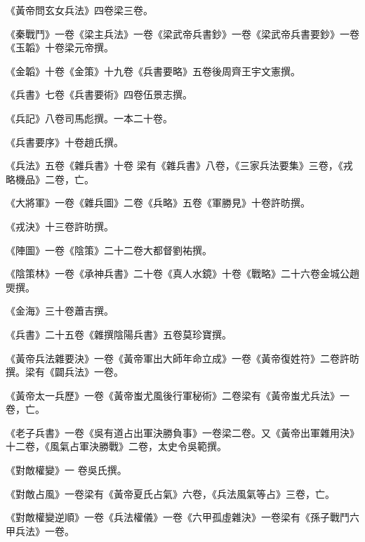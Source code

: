 \begin{pinyinscope}
 《黃帝問玄女兵法》四卷梁三卷。



 《秦戰鬥》一卷《梁主兵法》一卷《梁武帝兵書鈔》一卷《梁武帝兵書要鈔》一卷《玉韜》十卷梁元帝撰。



 《金韜》十卷《金策》十九卷《兵書要略》五卷後周齊王宇文憲撰。



 《兵書》七卷《兵書要術》四卷伍景志撰。



 《兵記》八卷司馬彪撰。一本二十卷。



 《兵書要序》十卷趙氏撰。



 《兵法》五卷《雜兵書》十卷
 梁有《雜兵書》八卷，《三家兵法要集》三卷，《戎略機品》二卷，亡。



 《大將軍》一卷《雜兵圖》二卷《兵略》五卷《軍勝見》十卷許昉撰。



 《戎決》十三卷許昉撰。



 《陣圖》一卷《陰策》二十二卷大都督劉祐撰。



 《陰策林》一卷《承神兵書》二十卷《真人水鏡》十卷《戰略》二十六卷金城公趙煚撰。



 《金海》三十卷蕭吉撰。



 《兵書》二十五卷《雜撰陰陽兵書》五卷莫珍寶撰。



 《黃帝兵法雜要決》一卷《黃帝軍出大師年命立成》一卷《黃帝復姓符》二卷許昉撰。梁有《闢兵法》一卷。



 《黃帝太一兵歷》一卷《黃帝蚩尤風後行軍秘術》二卷梁有《黃帝蚩尤兵法》一卷，亡。



 《老子兵書》一卷《吳有道占出軍決勝負事》一卷梁二卷。又《黃帝出軍雜用決》十二卷，《風氣占軍決勝戰》二卷，太史令吳範撰。



 《對敵權變》一
 卷吳氏撰。



 《對敵占風》一卷梁有《黃帝夏氏占氣》六卷，《兵法風氣等占》三卷，亡。



 《對敵權變逆順》一卷《兵法權儀》一卷《六甲孤虛雜決》一卷梁有《孫子戰鬥六甲兵法》一卷。




\end{pinyinscope}
